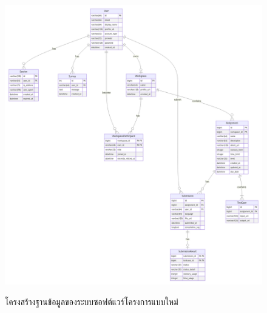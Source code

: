 \documentclass[12pt,one side,openright,a4paper]{cpe-thesis-th}
\begin{document}

\begin{figure}[H]
  \centering
  \includegraphics[width=15cm]{figure/diagram/database-v4.png}
  \label{fig:appendix-database}
  \caption[โครงสร้างฐานข้อมูลของระบบซอฟต์แวร์โครงการแบบใหม่]{โครงสร้างฐานข้อมูลของระบบซอฟต์แวร์โครงการแบบใหม่}
\end{figure}

\centering{} \\
\end{document}
